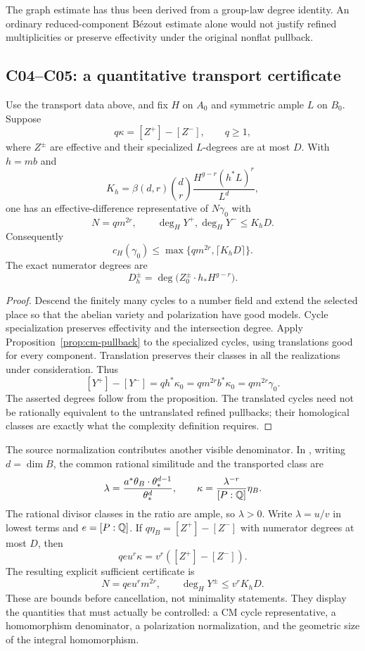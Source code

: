 The graph estimate has thus been derived from a group-law degree identity. An ordinary reduced-component B\'ezout estimate alone would not justify refined multiplicities or preserve effectivity under the original nonflat pullback.

\subsection{C04--C05: a quantitative transport certificate}

\begin{corollary}[C04]
\label{cor:cm-certificate}
Use the transport data above, and fix $H$ on $A_0$ and symmetric ample $L$ on $B_0$. Suppose
\[
q\kappa=[Z^+]-[Z^-],\qquad q\geq1,
\]
where $Z^\pm$ are effective and their specialized $L$-degrees are at most $D$. With $h=mb$ and
\[
K_h=\beta(d,r)\binom dr\frac{H^{g-r}(h^*L)^r}{L^d},
\]
one has an effective-difference representative of $N\gamma_0$ with
\[
N=qm^{2r},\qquad \deg_HY^+,\deg_HY^-\leq K_hD.
\]
Consequently
\begin{equation}
c_H(\gamma_0)\leq\max\{qm^{2r},\lceil K_hD\rceil\}.
\label{eq:cm-complexity}
\end{equation}
The exact numerator degrees are
\[
D_h^\pm=\deg\bigl(Z_0^\pm\cdot h_*H^{g-r}\bigr).
\]
\end{corollary}

\begin{proof}
Descend the finitely many cycles to a number field and extend the selected place so that the abelian variety and polarization have good models. Cycle specialization preserves effectivity and the intersection degree. Apply Proposition~\ref{prop:cm-pullback} to the specialized cycles, using translations good for every component. Translation preserves their classes in all the realizations under consideration. Thus
\[
[Y^+]-[Y^-]
=q h^*\kappa_0
=qm^{2r}b^*\kappa_0
=qm^{2r}\gamma_0.
\]
The asserted degrees follow from the proposition. The translated cycles need not be rationally equivalent to the untranslated refined pullbacks; their homological classes are exactly what the complexity definition requires.
\end{proof}

The source normalization contributes another visible denominator. In \cite[equations (3.15)--(3.16), p.~16]{OAI001}, writing $d=\dim B$, the common rational similitude and the transported class are
\[
\lambda=\frac{a^*\theta_B\cdot\theta_*^{d-1}}{\theta_*^d},
\qquad \kappa=\frac{\lambda^{-r}}{[P:\mathbb Q]}\eta_B.
\]
The rational divisor classes in the ratio are ample, so $\lambda>0$. Write $\lambda=u/v$ in lowest terms and $e=[P:\mathbb Q]$. If $q\eta_B=[Z^+]-[Z^-]$ with numerator degrees at most $D$, then
\[
qeu^r\kappa=v^r([Z^+]-[Z^-]).
\]
The resulting explicit sufficient certificate is
\begin{equation}
N=qeu^rm^{2r},\qquad
\deg_HY^\pm\leq v^rK_hD.
\label{eq:cm-normalization}
\end{equation}
These are bounds before cancellation, not minimality statements. They display the quantities that must actually be controlled: a CM cycle representative, a homomorphism denominator, a polarization normalization, and the geometric size of the integral homomorphism.

